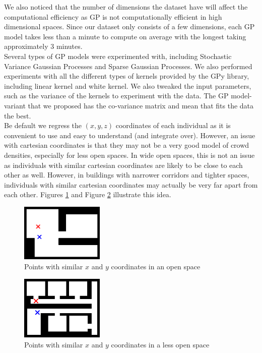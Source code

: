 \documentclass[letterpaper]{article}
\begin{document}
We also noticed that the number of dimensions the dataset have will affect the computational efficiency as GP is not computationally efficient in high dimensional spaces. Since our dataset only consists of a few dimensions, each GP model takes less than a minute to compute on average with the longest taking approximately 3 minutes.\\

Several types of GP models were experimented with, including Stochastic Variance Gaussian Processes and Sparse Gaussian Processes. We also performed experiments with all the different types of kernels provided by the GPy library, including linear kernel and white kernel. We also tweaked the input parameters, such as the variance of the kernels to experiment with the data. The GP model-variant that we proposed has the co-variance matrix and mean that fits the data the best. \\

Be default we regress the $(x,y,z)$ coordinates of each individual as it is convenient to use and easy to understand (and integrate over). However, an issue with cartesian coordinates is that they may not be a very good model of crowd densities, especially for less open spaces. In wide open spaces, this is not an issue as individuals with similar cartesian coordinates are likely to be close to each other as well. However, in buildings with narrower corridors and tighter spaces, individuals with similar cartesian coordinates may actually be very far apart from each other. Figures \ref{fig:opspace1} and Figure \ref{fig:opspace2} illustrate this idea.

\begin{figure}[h!]
  \centering
    \includegraphics[width=150px,natwidth=634,natheight=442]{openspace1.png}
  \caption{Points with similar $x$ and $y$ coordinates in an open space}
  \label{fig:opspace1}
\end{figure}

\begin{figure}[h!]
  \centering
    \includegraphics[width=150px,natwidth=570,natheight=442]{openspace2.png}
  \caption{Points with similar $x$ and $y$ coordinates in a less open space}
  \label{fig:opspace2}
\end{figure}
\end{document}

